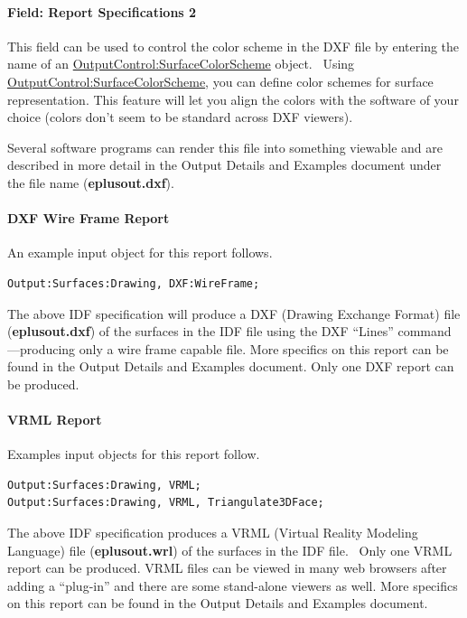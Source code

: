 \paragraph{Field: Report Specifications 2}\label{field-report-specifications-2}

This field can be used to control the color scheme in the DXF file by entering the name of an \hyperref[outputcontrolsurfacecolorscheme]{OutputControl:SurfaceColorScheme} object.~ Using \hyperref[outputcontrolsurfacecolorscheme]{OutputControl:SurfaceColorScheme}, you can define color schemes for surface representation. This feature will let you align the colors with the software of your choice (colors don't seem to be standard across DXF viewers).

Several software programs can render this file into something viewable and are described in more detail in the Output Details and Examples document under the file name (\textbf{eplusout.dxf}).

\paragraph{DXF Wire Frame Report}\label{dxf-wire-frame-report}

An example input object for this report follows.

\begin{lstlisting}
Output:Surfaces:Drawing, DXF:WireFrame;
\end{lstlisting}

The above IDF specification will produce a DXF (Drawing Exchange Format) file (\textbf{eplusout.dxf}) of the surfaces in the IDF file using the DXF ``Lines'' command---producing only a wire frame capable file. More specifics on this report can be found in the Output Details and Examples document. Only one DXF report can be produced.

\paragraph{VRML Report}\label{vrml-report}

Examples input objects for this report follow.

\begin{lstlisting}
Output:Surfaces:Drawing, VRML;
Output:Surfaces:Drawing, VRML, Triangulate3DFace;
\end{lstlisting}

The above IDF specification produces a VRML (Virtual Reality Modeling Language) file (\textbf{eplusout.wrl}) of the surfaces in the IDF file.~ Only one VRML report can be produced. VRML files can be viewed in many web browsers after adding a ``plug-in'' and there are some stand-alone viewers as well. More specifics on this report can be found in the Output Details and Examples document.

